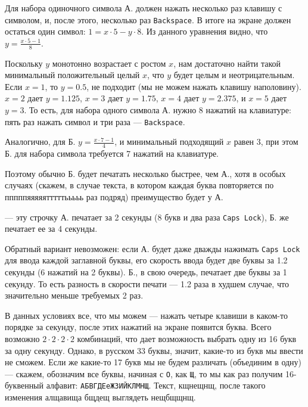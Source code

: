 ﻿
\begin{itemize}
\itA Для набора одиночного символа А. должен нажать несколько раз клавишу с символом, 
и, после этого, несколько раз \verb!Backspace!. В итоге на экране должен остаться один
символ: $1 = x \cdot 5 - y \cdot 8$. Из данного уравнения видно, что
$y = \frac{x \cdot 5 - 1}{8}$.

Поскольку $y$ монотонно возрастает с ростом $x$, нам достаточно найти такой минимальный 
положительный целый $x$, что $y$ будет целым и неотрицательным. Если $x=1$, то $y = 0.5$, 
не подходит (мы не можем нажать клавишу наполовину). $x=2$ дает $y = 1.125$, $x=3$ дает $y = 1.75$, $x=4$ дает $y = 2.375$,
и $x=5$ дает $y=3$. То есть, для набора одного символа А. нужно 8 нажатий на клавиатуре:
пять раз нажать символ и три раза --- \verb!Backspace!.

Аналогично, для Б. $y = \frac{x \cdot 7 - 1}{4}$, и минимальный подходящий $x$ равен 3, при этом
Б. для набора символа требуется 7 нажатий на клавиатуре.

Поэтому обычно Б. будет печатать несколько быстрее, чем А., хотя в особых случаях (скажем,
в случае текста, в котором каждая буква повторяется по пппппяяяяятттттььььь раз подряд)
преимущество будет у А.

 --- эту строчку А. печатает за 2 секунды (8 букв и два раза \verb!Caps Lock!), 
Б. же печатает ее за 4 секунды.

Обратный вариант невозможен: если А. будет даже дважды нажимать \verb!Caps Lock! для ввода 
каждой заглавной буквы, его скорость ввода будет две буквы за 1.2 секунды (6 нажатий на 2 буквы). 
Б., в свою очередь, печатает две буквы за 1 секунду. То есть разность в скорости печати --- 1.2 раза
в худшем случае, что значительно меньше требуемых 2 раз.

\itC В данных условиях все, что мы можем --- нажать четыре клавиши в каком-то порядке за секунду,
после этих нажатий на экране появится буква. 
Всего возможно $2\cdot 2 \cdot 2 \cdot 2$ комбинаций, что дает 
возможность выбрать одну из 16 букв за одну секунду. 
Однако, в русском 33 буквы, значит, какие-то из букв мы ввести не сможем. Если же какие-то 17
букв мы не будем различать (объединим в одну) --- скажем, обозначим все буквы, начиная с {\texttt{О}},
как {\texttt{Щ}}, то мы как раз получим 16-буквенный алфавит: {\texttt{АБВГДЕеЖЗИЙКЛМНЩ}}. 
Текст, кщнещнщ, после такого изменения алщавища бщдещ выглядеть нещбщщнщ.
\end{itemize}
